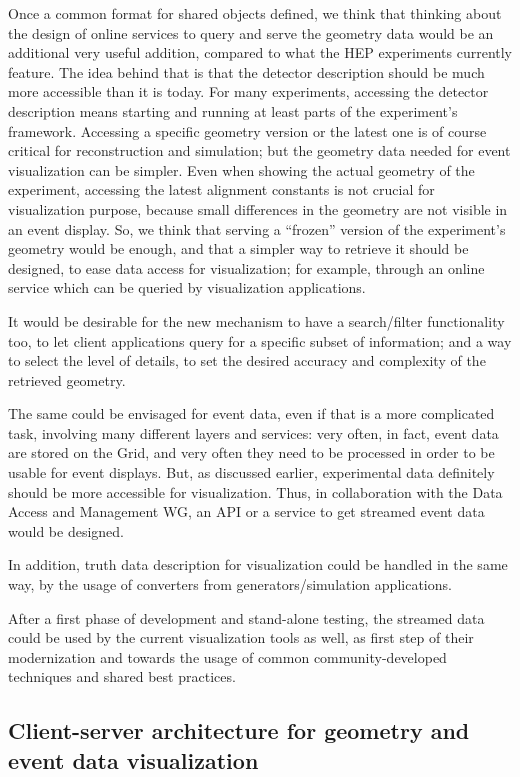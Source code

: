 \documentclass[12pt,a4paper]{article}
\begin{document}
Once a common format for shared objects defined, we think that thinking about the design of online services to query and
serve the geometry data would be an additional very useful addition, compared to what the HEP experiments currently feature.
The idea behind that is that the detector description should be much more accessible than it is today. For many experiments,
accessing the detector description means starting and running at least parts of the experiment’s framework. Accessing a specific
geometry version or the latest one is of course critical for reconstruction and simulation; but the geometry data needed for
event visualization can be simpler. Even when showing the actual geometry of the experiment, accessing the latest alignment
constants is not crucial for visualization purpose, because small differences in the geometry are not visible in an event display.
So, we think that serving a “frozen” version of the experiment’s geometry would be enough, and that a simpler way to retrieve
it should be designed, to ease data access for visualization; for example, through an online service which can be queried by
visualization applications.

It would be desirable for the new mechanism to have a search/filter functionality too, to let client applications query
for a specific subset of information; and a way to select the level of details, to set the desired accuracy and complexity
of the retrieved geometry.

The same could be envisaged for event data, even if that is a more complicated task, involving many different layers and services:
very often, in fact, event data are stored on the Grid, and very often they need to be processed in order to be usable for event displays.
But, as discussed earlier, experimental data definitely should be more accessible for visualization. Thus, in collaboration with
the Data Access and Management WG, an API or a service to get streamed event data would be designed.

In addition, truth data description for visualization could be handled in the same way, by the usage of converters from
generators/simulation applications.

After a first phase of development and stand-alone testing, the streamed data could be used by the current visualization tools
as well, as first step of their modernization and towards the usage of common community-developed techniques and shared best practices.

\hypertarget{client-server}{%
\subsection{Client-server architecture for geometry and event data visualization}\label{client-server}}
\end{document}
